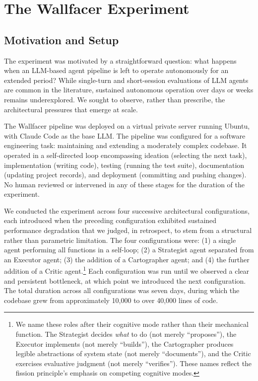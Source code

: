 \section{The Wallfacer Experiment}

\subsection{Motivation and Setup}

The experiment was motivated by a straightforward question: what happens when an LLM-based agent pipeline is left to operate autonomously for an extended period? While single-turn and short-session evaluations of LLM agents are common in the literature, sustained autonomous operation over days or weeks remains underexplored. We sought to observe, rather than prescribe, the architectural pressures that emerge at scale.

The Wallfacer pipeline was deployed on a virtual private server running Ubuntu, with Claude Code \cite{anthropic2024claude} as the base LLM. The pipeline was configured for a software engineering task: maintaining and extending a moderately complex codebase. It operated in a self-directed loop encompassing ideation (selecting the next task), implementation (writing code), testing (running the test suite), documentation (updating project records), and deployment (committing and pushing changes). No human reviewed or intervened in any of these stages for the duration of the experiment.

We conducted the experiment across four successive architectural configurations, each introduced when the preceding configuration exhibited sustained performance degradation that we judged, in retrospect, to stem from a structural rather than parametric limitation. The four configurations were: (1) a single agent performing all functions in a self-loop; (2) a Strategist agent separated from an Executor agent; (3) the addition of a Cartographer agent; and (4) the further addition of a Critic agent.\footnote{We name these roles after their cognitive mode rather than their mechanical function. The Strategist decides \emph{what} to do (not merely ``proposes''), the Executor implements (not merely ``builds''), the Cartographer produces legible abstractions of system state (not merely ``documents''), and the Critic exercises evaluative judgment (not merely ``verifies''). These names reflect the fission principle's emphasis on competing cognitive modes.} Each configuration was run until we observed a clear and persistent bottleneck, at which point we introduced the next configuration. The total duration across all configurations was seven days, during which the codebase grew from approximately 10,000 to over 40,000 lines of code.

